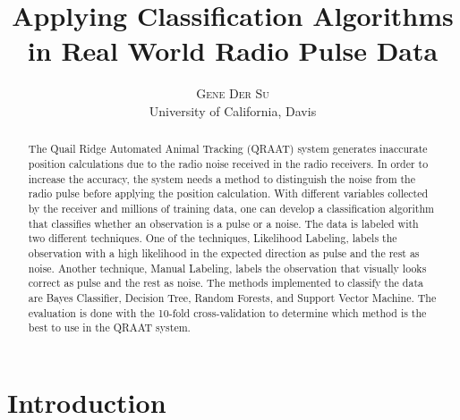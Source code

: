 \documentclass[twoside]{article}
\title{\vspace{-15mm}\fontsize{24pt}{10pt}\selectfont\textbf{Applying Classification Algorithms in Real World Radio Pulse Data}} %
\author{
\large
\textsc{Gene Der Su}\\
\normalsize University of California, Davis \\ %
\vspace{-5mm}
}
\date{}
\begin{document}
\maketitle %

\thispagestyle{fancy} %


\begin{abstract}

\noindent The Quail Ridge Automated Animal Tracking (QRAAT) system generates inaccurate position calculations due to the radio noise received in the radio receivers. In order to increase the accuracy, the system needs a method to distinguish the noise from the radio pulse before applying the position calculation. With different variables collected by the receiver and millions of training data, one can develop a classification algorithm that classifies whether an observation is a pulse or a noise. The data is labeled with two different techniques. One of the techniques, Likelihood Labeling, labels the observation with a high likelihood in the expected direction as pulse and the rest as noise. Another technique, Manual Labeling, labels the observation that visually looks correct as pulse and the rest as noise. The methods implemented to classify the data are Bayes Classifier, Decision Tree, Random Forests, and Support Vector Machine. The evaluation is done with the 10-fold cross-validation to determine which method is the best to use in the QRAAT system. 

\end{abstract}



\section{Introduction}

\end{document}
